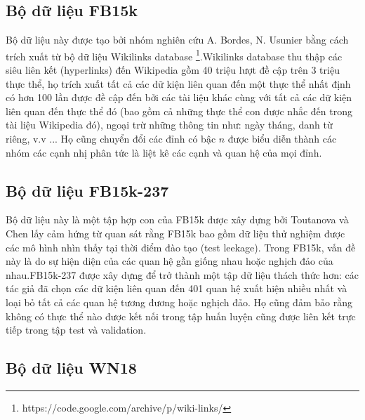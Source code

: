 \subsection{Bộ dữ liệu FB15k}

Bộ dữ liệu này được tạo bởi nhóm nghiên cứu A. Bordes, N. Usunier \cite{bordes2013translating} bằng cách trích xuất từ bộ dữ liệu Wikilinks database \footnote{https://code.google.com/archive/p/wiki-links/}.Wikilinks database thu thập các siêu liên kết (hyperlinks) đến Wikipedia gồm 40 triệu lượt đề cập trên 3 triệu thực thể, họ trích xuất tất cả các dữ kiện liên quan đến một thực thể nhất định có hơn 100 lần được đề cập đến bởi các tài liệu khác cùng với tất cả các dữ kiện liên quan đến thực thể đó (bao gồm cả những thực thể con được nhắc đến trong tài liệu Wikipedia đó), ngoại trừ những thông tin như: ngày tháng, danh từ riêng, v.v ... Họ cũng chuyển đổi các đỉnh có bậc \(n\) được biểu diễn thành các nhóm các cạnh nhị phân tức là liệt kê các cạnh và quan hệ của mọi đỉnh. 


\subsection{Bộ dữ liệu FB15k-237}

Bộ dữ liệu này là một tập hợp con của FB15k được xây dựng bởi Toutanova và Chen \cite{toutanova2015observed} lấy cảm hứng từ quan sát rằng FB15k bao gồm dữ liệu thử nghiệm được các mô hình nhìn thấy tại thời điểm đào tạo (test leekage). Trong FB15k, vấn đề này là do sự hiện diện của các quan hệ gần giống nhau hoặc nghịch đảo của nhau.FB15k-237 được xây dựng để trở thành một tập dữ liệu thách thức hơn: các tác giả đã chọn các dữ kiện liên quan đến 401 quan hệ xuất hiện nhiều nhất và loại bỏ tất cả các quan hệ tương đương hoặc nghịch đảo. Họ cũng đảm bảo rằng không có thực thể nào được kết nối trong tập huấn luyện cũng được liên kết trực tiếp trong tập test và validation.


\subsection{Bộ dữ liệu WN18}



